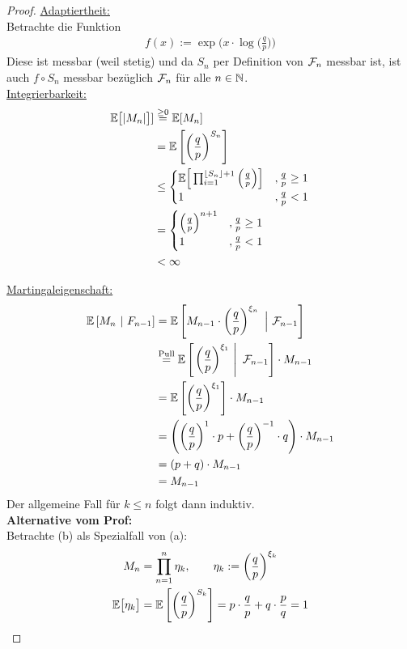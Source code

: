 \documentclass[12pt,a4paper]{article}
\begin{document}
\begin{proof}
	\underline{Adaptiertheit:}\\
	Betrachte die Funktion
	\begin{align*}
		f(x):= \exp\Big(x\cdot\log\Big(\frac{q}{p}\Big)\Big)
	\end{align*}
	Diese ist messbar (weil stetig) und da $S_n$ per Definition von $\mathcal{F}_n$ messbar ist, ist auch
	$f\circ S_n$ messbar bezüglich $\mathcal{F}_n$ für alle $n\in\mathbb{N}$.\\

	\underline{Integrierbarkeit:} %
	\begin{align*}
		\mathbb{E}\big[|M_n|\big]]
		&\stackrel{\geq0}{=}\mathbb{E}[M_n]\\
		&= \mathbb{E}\left[\left(\frac{q}{p}\right)^{S_n}\right] \\
		&\leq\begin{cases}
		\mathbb{E}\Big[\prod_{i=1}^{\lfloor S_n\rfloor + 1}\Big(\frac{q}{p}\Big)\Big] &,\frac{q}{p}\geq 1 \\
		1 &,\frac{q}{p} < 1 
	\end{cases} \\
		&=\begin{cases}
	\Big(\frac{q}{p}\Big)^{n+1} &,\frac{q}{p}\geq 1 \\
		1 &,\frac{q}{p} < 1 
	\end{cases} \\
	&< \infty
	\end{align*}

	\underline{Martingaleigenschaft:}
	\begin{align*}
		\mathbb{E}\left[{M_n}~|~{F_{n-1}}\right]
		&=\mathbb{E}\left[M_{n-1}\cdot\left(\frac{q}{p}\right)^{\xi_n}~\Big|~\mathcal{F}_{n-1}\right] \\
		&\stackrel{\text{Pull}}{=}
	\mathbb{E}\left[\left.\left(\frac{q}{p}\right)^{\xi_1}~\right|~\mathcal{F}_{n-1}\right]\cdot M_{n-1} \\
	&\stackrel{\text{}}{=}
	\mathbb{E}\left[\left(\frac{q}{p}\right)^{\xi_1}\right]\cdot M_{n-1} \\
		&=\left(\left(\frac{q}{p}\right)^1\cdot p + \left(\frac{q}{p}\right)^{-1}\cdot q\right)\cdot M_{n-1} \\
		&= (p+q)\cdot M_{n-1} \\
		&= M_{n-1}
	\end{align*}
Der allgemeine Fall für $k\leq n$ folgt dann induktiv.\\

\textbf{Alternative vom Prof:}\\
Betrachte (b) als Spezialfall von (a):
\begin{align*}
M_n&=\prod\limits_{n=1}^n \eta_k,\qquad\eta_k:=\left(\frac{q}{p}\right)^{\xi_k}\\
\mathbb{E}\big[\eta_k\big]&=\mathbb{E}\left[\left(\frac{q}{p}\right)^{S_k}\right]=p\cdot\frac{q}{p}+q\cdot\frac{p}{q}=1
\end{align*}
\end{proof}
\end{document}
